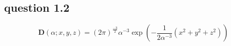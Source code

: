 \documentclass{jsarticle}
\begin{document}

\subsection {question 1.2}
\[
  \mathbf{D}(\alpha ; x, y, z) = (2\pi)^{\frac{-3}{2}} \alpha^{-3} \exp(- \frac{1}{2\alpha^{-3}}(x^2 + y^2 + z^2))
\]
\end{document}
